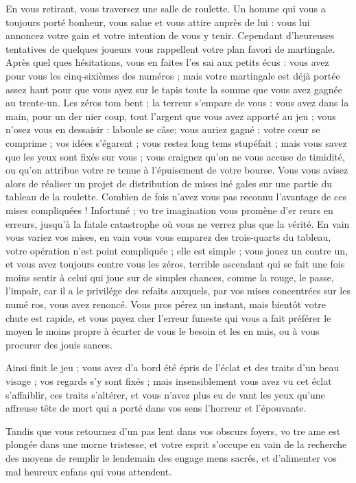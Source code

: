 En vous retirant, vous traversez
une salle de roulette. Un homme qui
vous a toujours porté bonheur, vous
salue et vous attire auprès de lui :
vous lui annoncez votre gain et votre
intention de vous y tenir. Cependant
d'heureuses tentatives de quelques
joueurs vous rappellent votre plan
favori de martingale. Après quel%
ques hésitations, vous en faites l'es%
sai aux petits écus : vous avez pour
vous les cinq-sixièmes des numéros ;
mais votre martingale est déjà portée
assez haut pour que vous ayez sur
le tapis toute la somme que vous avez
gagnée au trente-un. Les zéros tom%
bent ; la terreur s'empare de vous :
vous avez dans la main, pour un der
nier coup, tout l'argent que vous avez
apporté au jeu ; vous n'osez vous en
dessaisir : laboule se câse; vous auriez
gagné ; votre cœur se comprime ;
vos idées s'égarent ; vous restez long%
tems stupéfait ; mais vous savez que
les yeux sont fixés sur vous ; vous
craignez qu'on ne vous accuse de
timidité, ou qu'on attribue votre re%
tenue à l'épuisement de votre bourse.
Vous vous avisez alors de réaliser un
projet de distribution de mises iné%
gales sur une partie du tableau de
la roulette. Combien de fois n'avez%
vous pas reconnu l'avantage de ces
mises compliquées ! Infortuné ; vo%
tre imagination vous promène d'er%
reurs en erreurs, jusqu'à la fatale
catastrophe où vous ne verrez plus
que la vérité. En vain vous variez vos
mises, en vain vous vous emparez
des trois-quarts du tableau, votre
opération n'est point compliquée ;
elle est simple ; vous jouez un contre
un, et vous avez toujours contre vous
les zéros, terrible ascendant qui se
fait une fois moins sentir à celui qui
joue sur de simples chances, comme
la rouge, le passe, l'impair, car il a
le privilége des refaits auxquels, par
vos mises concentrées sur les numé%
ros, vous avez renoncé. Vous pros%
pérez un instant, mais bientôt votre
chute est rapide, et vous payez
cher l'erreur funeste qui vous a fait
préférer le moyen le moins propre
à écarter de vous le besoin et les en%
nuis, ou à vous procurer des jouis%
sances.

Ainsi finit le jeu ; vous avez d'a%
bord été épris de l'éclat et des traits
d'un beau visage ; vos regards s'y
sont fixés ; mais insensiblement vous
avez vu cet éclat s'affaiblir, ces traits
s'altérer, et vous n'avez plus eu de%
vant les yeux qu'une affreuse tête
de mort qui a porté dans vos sens
l'horreur et l'épouvante.

Tandis que vous retournez d'un
pas lent dans vos obscurs foyers, vo%
tre ame est plongée dans une morne
tristesse, et votre esprit s'occupe en
vain de la recherche des moyens de
remplir le lendemain des engage%
mens sacrés, et d'alimenter vos mal%
heureux enfans qui vous attendent.

